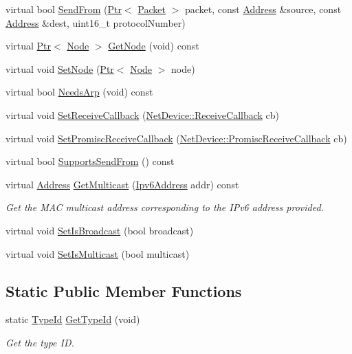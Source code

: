 \begin{DoxyCompactItemize}
\item 
virtual bool \hyperlink{classns3_1_1FdNetDevice_acf6a3cd28d254cd41c1776cbb55095cb}{Send\+From} (\hyperlink{classns3_1_1Ptr}{Ptr}$<$ \hyperlink{classns3_1_1Packet}{Packet} $>$ packet, const \hyperlink{classns3_1_1Address}{Address} \&source, const \hyperlink{classns3_1_1Address}{Address} \&dest, uint16\+\_\+t protocol\+Number)
\item 
virtual \hyperlink{classns3_1_1Ptr}{Ptr}$<$ \hyperlink{classns3_1_1Node}{Node} $>$ \hyperlink{classns3_1_1FdNetDevice_a301f937cb45179136ad4b2fe4750a56f}{Get\+Node} (void) const 
\item 
virtual void \hyperlink{classns3_1_1FdNetDevice_a2f695f5c375f5e69df201956347881aa}{Set\+Node} (\hyperlink{classns3_1_1Ptr}{Ptr}$<$ \hyperlink{classns3_1_1Node}{Node} $>$ node)
\item 
virtual bool \hyperlink{classns3_1_1FdNetDevice_a2cd99374da02cce70f3c2f06b8c41d3d}{Needs\+Arp} (void) const 
\item 
virtual void \hyperlink{classns3_1_1FdNetDevice_a4a2ba76da683b88593eb4456169cbf21}{Set\+Receive\+Callback} (\hyperlink{classns3_1_1NetDevice_ad5e5e1ca187472bc2ba99575d8def568}{Net\+Device\+::\+Receive\+Callback} cb)
\item 
virtual void \hyperlink{classns3_1_1FdNetDevice_abdca762c17ee6f58513daefb92b18471}{Set\+Promisc\+Receive\+Callback} (\hyperlink{classns3_1_1NetDevice_a427225795919f26c414bee2ea3f31ed2}{Net\+Device\+::\+Promisc\+Receive\+Callback} cb)
\item 
virtual bool \hyperlink{classns3_1_1FdNetDevice_a658792f0ed912154af2a2ffd90ce9905}{Supports\+Send\+From} () const 
\item 
virtual \hyperlink{classns3_1_1Address}{Address} \hyperlink{classns3_1_1FdNetDevice_a174a683ff194065093e8a9f1b496207a}{Get\+Multicast} (\hyperlink{classns3_1_1Ipv6Address}{Ipv6\+Address} addr) const 
\begin{DoxyCompactList}\small\item\em Get the M\+AC multicast address corresponding to the I\+Pv6 address provided. \end{DoxyCompactList}\item 
virtual void \hyperlink{classns3_1_1FdNetDevice_a2a3c8e37a145215384b62a2a7d7618b9}{Set\+Is\+Broadcast} (bool broadcast)
\item 
virtual void \hyperlink{classns3_1_1FdNetDevice_ad94f95495b987f43330cfa3ee4088ce5}{Set\+Is\+Multicast} (bool multicast)
\end{DoxyCompactItemize}
\subsection*{Static Public Member Functions}
\begin{DoxyCompactItemize}
\item 
static \hyperlink{classns3_1_1TypeId}{Type\+Id} \hyperlink{classns3_1_1FdNetDevice_a8b80cb55852cbf8874d160bf2f4a3dc8}{Get\+Type\+Id} (void)
\begin{DoxyCompactList}\small\item\em Get the type ID. \end{DoxyCompactList}\end{DoxyCompactItemize}
